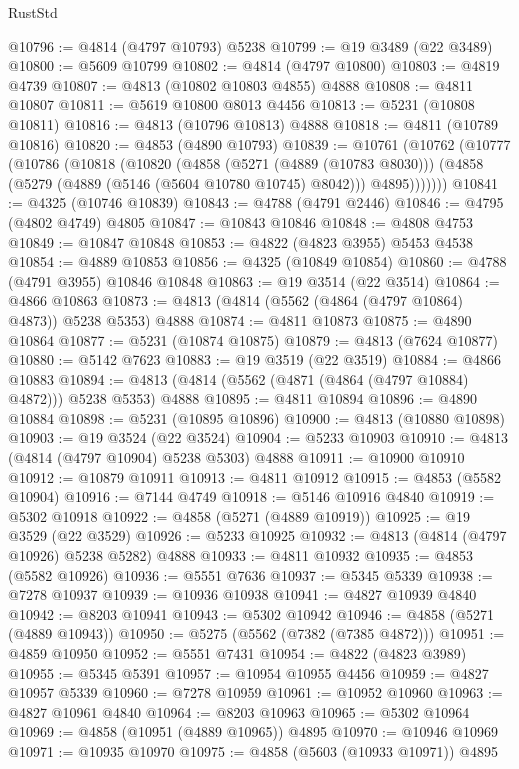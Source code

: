 \begin{lexlean}{RustStd}
\begin{coremodule}
@10796 := @4814 (@4797 @10793) @5238
@10799 := @19 @3489 (@22 @3489)
@10800 := @5609 @10799
@10802 := @4814 (@4797 @10800)
@10803 := @4819 @4739
@10807 := @4813 (@10802 @10803 @4855) @4888
@10808 := @4811 @10807
@10811 := @5619 @10800 @8013 @4456
@10813 := @5231 (@10808 @10811)
@10816 := @4813 (@10796 @10813) @4888
@10818 := @4811 (@10789 @10816)
@10820 := @4853 (@4890 @10793)
@10839 := @10761
    (@10762
      (@10777
        (@10786
          (@10818
            (@10820
              (@4858
                (@5271 (@4889 (@10783 @8030)))
                (@4858 (@5279 (@4889 (@5146 (@5604 @10780 @10745) @8042))) @4895)))))))
@10841 := @4325 (@10746 @10839)
@10843 := @4788 (@4791 @2446)
@10846 := @4795 (@4802 @4749) @4805
@10847 := @10843 @10846
@10848 := @4808 @4753
@10849 := @10847 @10848
@10853 := @4822 (@4823 @3955) @5453 @4538
@10854 := @4889 @10853
@10856 := @4325 (@10849 @10854)
@10860 := @4788 (@4791 @3955) @10846 @10848
@10863 := @19 @3514 (@22 @3514)
@10864 := @4866 @10863
@10873 := @4813 (@4814 (@5562 (@4864 (@4797 @10864) @4873)) @5238 @5353) @4888
@10874 := @4811 @10873
@10875 := @4890 @10864
@10877 := @5231 (@10874 @10875)
@10879 := @4813 (@7624 @10877)
@10880 := @5142 @7623
@10883 := @19 @3519 (@22 @3519)
@10884 := @4866 @10883
@10894 := @4813 (@4814 (@5562 (@4871 (@4864 (@4797 @10884) @4872))) @5238 @5353) @4888
@10895 := @4811 @10894
@10896 := @4890 @10884
@10898 := @5231 (@10895 @10896)
@10900 := @4813 (@10880 @10898)
@10903 := @19 @3524 (@22 @3524)
@10904 := @5233 @10903
@10910 := @4813 (@4814 (@4797 @10904) @5238 @5303) @4888
@10911 := @10900 @10910
@10912 := @10879 @10911
@10913 := @4811 @10912
@10915 := @4853 (@5582 @10904)
@10916 := @7144 @4749
@10918 := @5146 @10916 @4840
@10919 := @5302 @10918
@10922 := @4858 (@5271 (@4889 @10919))
@10925 := @19 @3529 (@22 @3529)
@10926 := @5233 @10925
@10932 := @4813 (@4814 (@4797 @10926) @5238 @5282) @4888
@10933 := @4811 @10932
@10935 := @4853 (@5582 @10926)
@10936 := @5551 @7636
@10937 := @5345 @5339
@10938 := @7278 @10937
@10939 := @10936 @10938
@10941 := @4827 @10939 @4840
@10942 := @8203 @10941
@10943 := @5302 @10942
@10946 := @4858 (@5271 (@4889 @10943))
@10950 := @5275 (@5562 (@7382 (@7385 @4872)))
@10951 := @4859 @10950
@10952 := @5551 @7431
@10954 := @4822 (@4823 @3989)
@10955 := @5345 @5391
@10957 := @10954 @10955 @4456
@10959 := @4827 @10957 @5339
@10960 := @7278 @10959
@10961 := @10952 @10960
@10963 := @4827 @10961 @4840
@10964 := @8203 @10963
@10965 := @5302 @10964
@10969 := @4858 (@10951 (@4889 @10965)) @4895
@10970 := @10946 @10969
@10971 := @10935 @10970
@10975 := @4858 (@5603 (@10933 @10971)) @4895

\end{coremodule}
\end{lexlean}
